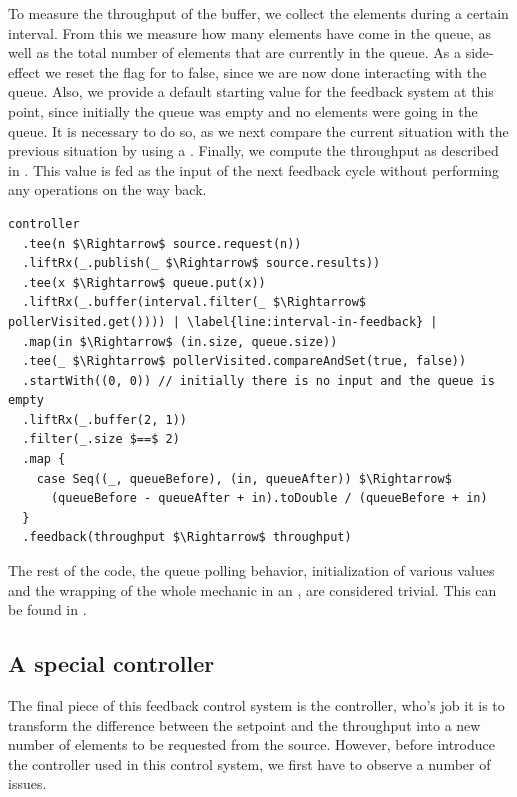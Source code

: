 To measure the throughput of the buffer, we collect the elements during a certain interval. From this we measure how many elements have come in the queue, as well as the total number of elements that are currently in the queue. As a side-effect we reset the flag for  to false, since we are now done interacting with the queue. Also, we provide a default starting value for the feedback system at this point, since initially the queue was empty and no elements were going in the queue. It is necessary to do so, as we next compare the current situation with the previous situation by using a . Finally, we compute the throughput as described in . This value is fed as the input of the next feedback cycle without performing any operations on the way back.

\begin{minipage}{\linewidth}
\begin{lstlisting}[style=ScalaStyle, caption={Feedback system for controlling the buffer}, label={lst:buffer-feedback-control}]
controller
  .tee(n $\Rightarrow$ source.request(n))
  .liftRx(_.publish(_ $\Rightarrow$ source.results))
  .tee(x $\Rightarrow$ queue.put(x))
  .liftRx(_.buffer(interval.filter(_ $\Rightarrow$ pollerVisited.get()))) | \label{line:interval-in-feedback} |
  .map(in $\Rightarrow$ (in.size, queue.size))
  .tee(_ $\Rightarrow$ pollerVisited.compareAndSet(true, false))
  .startWith((0, 0)) // initially there is no input and the queue is empty
  .liftRx(_.buffer(2, 1))
  .filter(_.size $==$ 2)
  .map {
    case Seq((_, queueBefore), (in, queueAfter)) $\Rightarrow$
      (queueBefore - queueAfter + in).toDouble / (queueBefore + in)
  }
  .feedback(throughput $\Rightarrow$ throughput)
\end{lstlisting}
\end{minipage}

The rest of the code, the queue polling behavior, initialization of various values and the wrapping of the whole mechanic in an , are considered trivial. This can be found in .

\subsection{A special controller}
\label{subsec:controller-design}
The final piece of this feedback control system is the controller, who's job it is to transform the difference between the setpoint and the throughput into a new number of elements to be requested from the source. However, before introduce the controller used in this control system, we first have to observe a number of issues.

